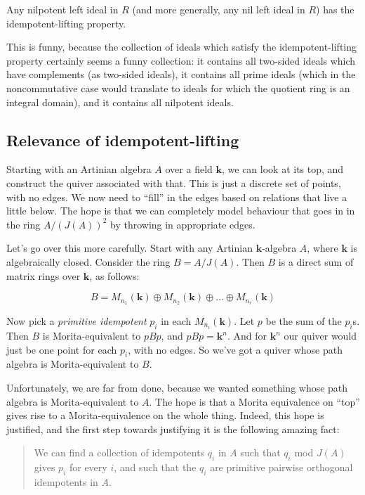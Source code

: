\documentclass[a4paper]{amsart}
\newcommand{\field}{\mathbf{k}}
\begin{document}
\begin{theorem}
  Any nilpotent left ideal in $R$ (and more generally, any nil left
  ideal in $R$) has the idempotent-lifting property.
\end{theorem}

This is funny, because the collection of ideals which satisfy the
idempotent-lifting property certainly seems a funny collection: it
contains all two-sided ideals which have complements (as two-sided
ideals), it contains all prime ideals (which in the noncommutative
case would translate to ideals for which the quotient ring is an
integral domain), and it contains all nilpotent ideals. 

\subsection{Relevance of idempotent-lifting}

Starting with an Artinian algebra $A$ over a field $\field$, we can
look at its top, and construct the quiver associated with that. This
is just a discrete set of points, with no edges. We now need to
``fill'' in the edges based on relations that live a little below.
The hope is that we can completely model behaviour that goes in in the
ring $A/(J(A))^2$ by throwing in appropriate edges.

Let's go over this more carefully. Start with any Artinian
$\field$-algebra $A$, where $\field$ is algebraically closed. Consider
the ring $B = A/J(A)$. Then $B$ is a direct sum of matrix rings over
$\field$, as follows:

$$B = M_{n_1}(\field) \oplus M_{n_2}(\field) \oplus \ldots \oplus M_{n_r}(\field)$$

Now pick a {\em primitive idempotent} $p_i$ in each
$M_{n_i}(\field)$. Let $p$ be the sum of the $p_i$s. Then $B$ is
Morita-equivalent to $pBp$, and $pBp = \field^n$. And for $\field^n$
our quiver would just be one point for each $p_i$, with no edges. So
we've got a quiver whose path algebra is Morita-equivalent to $B$.

Unfortunately, we are far from done, because we wanted something whose
path algebra is Morita-equivalent to $A$. The hope is that a Morita
equivalence on ``top'' gives rise to a Morita-equivalence on the whole
thing. Indeed, this hope is justified, and the first step
towards justifying it is the following amazing fact:

\begin{quote}
  We can find a collection of idempotents $q_i$ in $A$ such that
  $q_i$ mod $J(A)$ gives $p_i$ for every $i$, and such that the
  $q_i$ are primitive pairwise orthogonal idempotents in $A$.
\end{quote}
\end{document}

